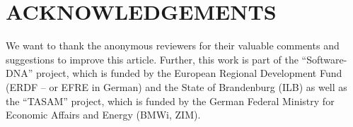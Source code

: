 \documentclass[a4paper,twoside]{article}
\begin{document}
\section*{\uppercase{Acknowledgements}}
\label{sec:acknowledgements}
\noindent
We want to thank the anonymous reviewers for their valuable comments and suggestions to improve this article.
Further, this work is part of the \enquote{Software-DNA} project, which is funded by the
European Regional Development Fund (ERDF -- or EFRE in German) and the
State of Brandenburg (ILB) as well as the \enquote{TASAM} project, which is funded by the German Federal Ministry for Economic Affairs and Energy (BMWi, ZIM).


{\small
}

\begin{acronym}
\end{acronym}
\end{document}
